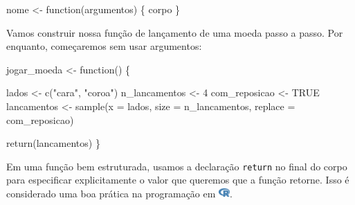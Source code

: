 \documentclass[
  letterpaper,
]{book}
\newenvironment{Shaded}{\begin{snugshade}}{\end{snugshade}}
\newcommand{\AttributeTok}[1]{\textcolor[rgb]{0.40,0.45,0.13}{#1}}
\newcommand{\ConstantTok}[1]{\textcolor[rgb]{0.56,0.35,0.01}{#1}}
\newcommand{\ControlFlowTok}[1]{\textcolor[rgb]{0.00,0.23,0.31}{#1}}
\newcommand{\DecValTok}[1]{\textcolor[rgb]{0.68,0.00,0.00}{#1}}
\newcommand{\FunctionTok}[1]{\textcolor[rgb]{0.28,0.35,0.67}{#1}}
\newcommand{\NormalTok}[1]{\textcolor[rgb]{0.00,0.23,0.31}{#1}}
\newcommand{\OtherTok}[1]{\textcolor[rgb]{0.00,0.23,0.31}{#1}}
\newcommand{\StringTok}[1]{\textcolor[rgb]{0.13,0.47,0.30}{#1}}
\theoremstyle{definition}
\theoremstyle{plain}
\theoremstyle{remark}
\begin{document}
\begin{Shaded}
\begin{Highlighting}[]
\NormalTok{nome }\OtherTok{\textless{}{-}} \ControlFlowTok{function}\NormalTok{(argumentos) \{}
\NormalTok{  corpo}
\NormalTok{\}}
\end{Highlighting}
\end{Shaded}

Vamos construir nossa função de lançamento de uma moeda passo a passo.
Por enquanto, começaremos sem usar argumentos:

\begin{Shaded}
\begin{Highlighting}[]
\NormalTok{jogar\_moeda }\OtherTok{\textless{}{-}} \ControlFlowTok{function}\NormalTok{() \{}
  
\NormalTok{  lados }\OtherTok{\textless{}{-}} \FunctionTok{c}\NormalTok{(}\StringTok{"cara"}\NormalTok{, }\StringTok{"coroa"}\NormalTok{)}
\NormalTok{  n\_lancamentos }\OtherTok{\textless{}{-}} \DecValTok{4}
\NormalTok{  com\_reposicao }\OtherTok{\textless{}{-}} \ConstantTok{TRUE}
\NormalTok{  lancamentos }\OtherTok{\textless{}{-}} \FunctionTok{sample}\NormalTok{(}\AttributeTok{x =}\NormalTok{ lados, }
                        \AttributeTok{size =}\NormalTok{ n\_lancamentos, }
                        \AttributeTok{replace =}\NormalTok{ com\_reposicao)}
  
  \FunctionTok{return}\NormalTok{(lancamentos)}
\NormalTok{\}}
\end{Highlighting}
\end{Shaded}

\begin{tcolorbox}[enhanced jigsaw, colback=white, bottomrule=.15mm, colframe=quarto-callout-tip-color-frame, rightrule=.15mm, opacityback=0, toptitle=1mm, arc=.35mm, toprule=.15mm, bottomtitle=1mm, titlerule=0mm, opacitybacktitle=0.6, leftrule=.75mm, colbacktitle=quarto-callout-tip-color!10!white, coltitle=black, title=\textcolor{quarto-callout-tip-color}{\faLightbulb}\hspace{0.5em}{Dica}, breakable, left=2mm]

Em uma função bem estruturada, usamos a declaração \texttt{return} no
final do corpo para especificar explicitamente o valor que queremos que
a função retorne. Isso é considerado uma boa prática na programação em
\includegraphics[width=1.13em,height=1em]{getting_started_with_r_files/figure-pdf/fa-icon-9b00320707d42527dde67262afb33ded.pdf}.

\end{tcolorbox}
\end{document}
